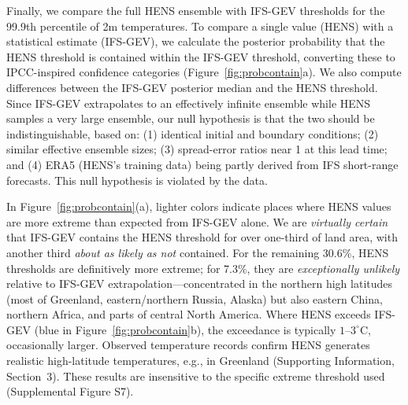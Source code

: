 \documentclass[draft]{agujournal2019}
\begin{document}
Finally, we compare the full HENS ensemble with IFS-GEV thresholds for the 99.9th percentile of 2m temperatures. To compare a single value (HENS) with a statistical estimate (IFS-GEV), we calculate the posterior probability that the HENS threshold is contained within the IFS-GEV threshold, converting these to IPCC-inspired confidence categories \citep{mastrandrea2010guidance,Risser2025data} (Figure~\ref{fig:probcontain}a). We also compute differences between the IFS-GEV posterior median and the HENS threshold. Since IFS-GEV extrapolates to an effectively infinite ensemble while HENS samples a very large ensemble, our null hypothesis is that the two should be indistinguishable, based on: (1) identical initial and boundary conditions; (2) similar effective ensemble sizes; (3) spread-error ratios near 1 at this lead time; and (4) ERA5 (HENS's training data) being partly derived from IFS short-range forecasts. This null hypothesis is violated by the data.

In Figure~\ref{fig:probcontain}(a), lighter colors indicate places where HENS values are more extreme than expected from IFS-GEV alone. We are \textit{virtually certain} that IFS-GEV contains the HENS threshold for over one-third of land area, with another third \textit{about as likely as not} contained. For the remaining 30.6\%, HENS thresholds are definitively more extreme; for 7.3\%, they are \textit{exceptionally unlikely} relative to IFS-GEV extrapolation---concentrated in the northern high latitudes (most of Greenland, eastern/northern Russia, Alaska) but also eastern China, northern Africa, and parts of central North America. Where HENS exceeds IFS-GEV (blue in Figure~\ref{fig:probcontain}b), the exceedance is typically $1$--$3^\circ$C, occasionally larger. Observed temperature records confirm HENS generates realistic high-latitude temperatures, e.g., in Greenland (Supporting Information, Section~3). These results are insensitive to the specific extreme threshold used (Supplemental Figure S7).
\end{document}
